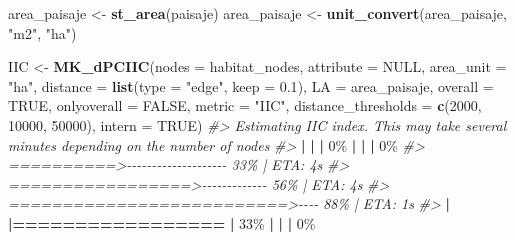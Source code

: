 \documentclass[
]{book}
\newenvironment{Shaded}{\begin{snugshade}}{\end{snugshade}}
\newcommand{\AttributeTok}[1]{\textcolor[rgb]{0.13,0.29,0.53}{#1}}
\newcommand{\CommentTok}[1]{\textcolor[rgb]{0.56,0.35,0.01}{\textit{#1}}}
\newcommand{\ConstantTok}[1]{\textcolor[rgb]{0.56,0.35,0.01}{#1}}
\newcommand{\DecValTok}[1]{\textcolor[rgb]{0.00,0.00,0.81}{#1}}
\newcommand{\ErrorTok}[1]{\textcolor[rgb]{0.64,0.00,0.00}{\textbf{#1}}}
\newcommand{\FloatTok}[1]{\textcolor[rgb]{0.00,0.00,0.81}{#1}}
\newcommand{\FunctionTok}[1]{\textcolor[rgb]{0.13,0.29,0.53}{\textbf{#1}}}
\newcommand{\NormalTok}[1]{#1}
\newcommand{\OtherTok}[1]{\textcolor[rgb]{0.56,0.35,0.01}{#1}}
\newcommand{\SpecialCharTok}[1]{\textcolor[rgb]{0.81,0.36,0.00}{\textbf{#1}}}
\newcommand{\StringTok}[1]{\textcolor[rgb]{0.31,0.60,0.02}{#1}}
\begin{document}
\begin{Shaded}
\begin{Highlighting}[]
\NormalTok{area\_paisaje }\OtherTok{\textless{}{-}} \FunctionTok{st\_area}\NormalTok{(paisaje) }
\NormalTok{area\_paisaje }\OtherTok{\textless{}{-}} \FunctionTok{unit\_convert}\NormalTok{(area\_paisaje, }\StringTok{"m2"}\NormalTok{, }\StringTok{"ha"}\NormalTok{) }

\NormalTok{IIC }\OtherTok{\textless{}{-}} \FunctionTok{MK\_dPCIIC}\NormalTok{(}\AttributeTok{nodes =}\NormalTok{ habitat\_nodes,}
                \AttributeTok{attribute =} \ConstantTok{NULL}\NormalTok{,}
                \AttributeTok{area\_unit =} \StringTok{"ha"}\NormalTok{,}
                \AttributeTok{distance =} \FunctionTok{list}\NormalTok{(}\AttributeTok{type =} \StringTok{"edge"}\NormalTok{, }\AttributeTok{keep =} \FloatTok{0.1}\NormalTok{),}
                \AttributeTok{LA =}\NormalTok{ area\_paisaje,}
                \AttributeTok{overall =} \ConstantTok{TRUE}\NormalTok{,}
                \AttributeTok{onlyoverall =} \ConstantTok{FALSE}\NormalTok{,}
                \AttributeTok{metric =} \StringTok{"IIC"}\NormalTok{,}
                \AttributeTok{distance\_thresholds =} \FunctionTok{c}\NormalTok{(}\DecValTok{2000}\NormalTok{, }\DecValTok{10000}\NormalTok{, }\DecValTok{50000}\NormalTok{),}
                \AttributeTok{intern =} \ConstantTok{TRUE}\NormalTok{)}
\CommentTok{\#\textgreater{} Estimating IIC index. This may take several minutes depending on the number of nodes}
\CommentTok{\#\textgreater{} }
  \SpecialCharTok{|}                                                        
  \ErrorTok{|}                                                  \ErrorTok{|}   \DecValTok{0}\NormalTok{\%}
  \SpecialCharTok{|}                                                        
  \ErrorTok{|}                                                  \ErrorTok{|}   \DecValTok{0}\NormalTok{\%}
\CommentTok{\#\textgreater{}  ==========\textgreater{}{-}{-}{-}{-}{-}{-}{-}{-}{-}{-}{-}{-}{-}{-}{-}{-}{-}{-}{-}{-}   33\% |  ETA:  4s}
\CommentTok{\#\textgreater{}  =================\textgreater{}{-}{-}{-}{-}{-}{-}{-}{-}{-}{-}{-}{-}{-}   56\% |  ETA:  4s}
\CommentTok{\#\textgreater{}  ==========================\textgreater{}{-}{-}{-}{-}   88\% |  ETA:  1s}
\CommentTok{\#\textgreater{} }
  \SpecialCharTok{|}                                                        
  \ErrorTok{|=================}                                 \ErrorTok{|}  \DecValTok{33}\NormalTok{\%}
  \SpecialCharTok{|}                                                        
  \ErrorTok{|}                                                  \ErrorTok{|}   \DecValTok{0}\NormalTok{\%}

\end{Highlighting}
\end{Shaded}
\end{document}

